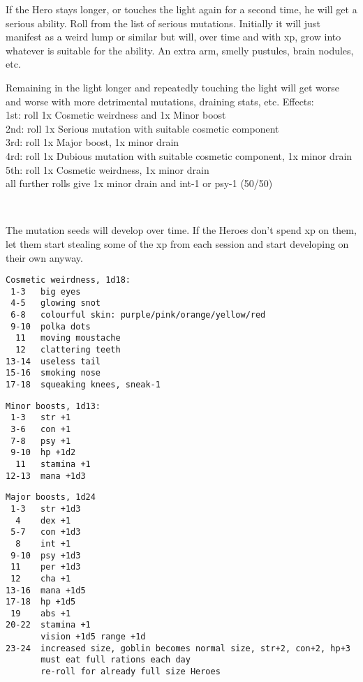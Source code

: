If the Hero stays longer, or touches the light again for a second time, he will get a serious ability. Roll from the list of serious mutations. Initially it will just manifest as a weird lump or similar but will, over time and with xp, grow into whatever is suitable for the ability. An extra arm, smelly pustules, brain nodules, etc.

Remaining in the light longer and repeatedly touching the light will get worse and worse with more detrimental mutations, draining stats, etc. Effects:\\
1st: roll 1x Cosmetic weirdness and 1x Minor boost\\
2nd: roll 1x Serious mutation with suitable cosmetic component\\
3rd: roll 1x Major boost, 1x minor drain\\
4rd: roll 1x Dubious mutation with suitable cosmetic component, 1x minor drain\\
5th: roll 1x Cosmetic weirdness, 1x minor drain\\
all further rolls give 1x minor drain and int-1 or psy-1 (50/50)

\

The mutation seeds will develop over time. If the Heroes don't spend xp on them, let them start stealing some of the xp from each session and start developing on their own anyway.


\raggedbottom

\goodbreak \small \begin{samepage} \begin{verbatim}
Cosmetic weirdness, 1d18:
 1-3   big eyes
 4-5   glowing snot
 6-8   colourful skin: purple/pink/orange/yellow/red
 9-10  polka dots
  11   moving moustache
  12   clattering teeth
13-14  useless tail
15-16  smoking nose
17-18  squeaking knees, sneak-1
\end{verbatim} \end{samepage} \normalsize

\goodbreak \small \begin{samepage} \begin{verbatim}
Minor boosts, 1d13:
 1-3   str +1
 3-6   con +1
 7-8   psy +1
 9-10  hp +1d2
  11   stamina +1
12-13  mana +1d3
\end{verbatim} \end{samepage} \normalsize

\goodbreak \small \begin{samepage} \begin{verbatim}
Major boosts, 1d24
 1-3   str +1d3
  4    dex +1
 5-7   con +1d3
  8    int +1
 9-10  psy +1d3
 11    per +1d3
 12    cha +1
13-16  mana +1d5
17-18  hp +1d5
 19    abs +1
20-22  stamina +1
       vision +1d5 range +1d
23-24  increased size, goblin becomes normal size, str+2, con+2, hp+3
       must eat full rations each day
       re-roll for already full size Heroes
\end{verbatim} \end{samepage} \normalsize

